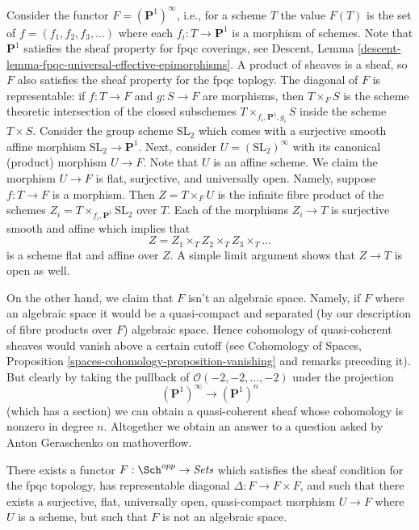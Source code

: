 \noindent
Consider the functor $F = (\mathbf{P}^1)^\infty$, i.e., for a scheme $T$
the value $F(T)$ is the set of $f = (f_1, f_2, f_3, \ldots)$ where each
$f_i : T \to \mathbf{P}^1$ is a morphism of schemes. Note that
$\mathbf{P}^1$ satisfies the sheaf property for fpqc coverings, see
Descent, Lemma \ref{descent-lemma-fpqc-universal-effective-epimorphisms}.
A product of sheaves is a sheaf, so $F$ also satisfies the sheaf property for
the fpqc toplogy. The diagonal of $F$ is representable: if $f : T \to F$
and $g : S \to F$ are morphisms, then $T \times_F S$ is the scheme theoretic
intersection of the closed subschemes $T \times_{f_i, \mathbf{P}^1, g_i} S$
inside the scheme $T \times S$. Consider the group scheme $\text{SL}_2$ which
comes with a surjective smooth affine morphism $\text{SL}_2 \to \mathbf{P}^1$.
Next, consider $U = (\text{SL}_2)^\infty$ with its canonical (product) morphism
$U \to F$. Note that $U$ is an affine scheme. We claim the morphism
$U \to F$ is flat, surjective, and universally open. Namely, suppose
$f : T \to F$ is a morphism. Then $Z = T \times_F U$ is the infinite
fibre product of the schemes $Z_i = T \times_{f_i, \mathbf{P}^1} \text{SL}_2$
over $T$. Each of the morphisms $Z_i \to T$ is surjective smooth and
affine which implies that
$$
Z = Z_1 \times_T Z_2 \times_T Z_3 \times_T \ldots
$$
is a scheme flat and affine over $Z$. A simple limit argument shows that
$Z \to T$ is open as well.

\medskip\noindent
On the other hand, we claim that $F$ isn't an algebraic space.
Namely, if $F$ where an algebraic space it would be a quasi-compact
and separated (by our description of fibre products over $F$) algebraic
space. Hence cohomology of quasi-coherent sheaves would vanish above a
certain cutoff (see
Cohomology of Spaces, Proposition \ref{spaces-cohomology-proposition-vanishing}
and remarks preceding it). But clearly by taking the pullback
of $\mathcal{O}(-2, -2, \ldots, -2)$ under the projection
$$
(\mathbf{P}^1)^\infty \longrightarrow (\mathbf{P}^1)^n
$$
(which has a section) we can obtain a quasi-coherent sheaf whose cohomology
is nonzero in degree $n$. Altogether we obtain an answer to a question asked
by Anton Geraschenko on mathoverflow.

\begin{lemma}
\label{lemma-not-algebraic}
There exists a functor $F : \Sch^{opp} \to \textit{Sets}$
which satisfies the sheaf condition for the fpqc topology, has representable
diagonal $\Delta : F \to F \times F$, and such that there exists a
surjective, flat, universally open, quasi-compact morphism
$U \to F$ where $U$ is a scheme, but such that $F$ is not an algebraic space.
\end{lemma}

